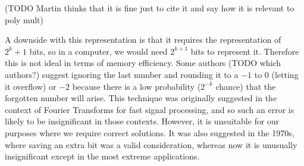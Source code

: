 \medskip

(TODO Martin thinks that it is fine just to cite it and say how it is relevant to poly mult)

\medskip

A downside with this representation is that it requires the representation of $2^k + 1$ bits, so in a computer, we would need $2^{k+1}$ bits to represent it. Therefore this is not ideal in terms of memory efficiency. Some authors (TODO which authors?) suggest ignoring the last number and rounding it to a $-1$ to $0$ (letting it overflow) or $-2$ because there is a low probability ($2^{-k}$ chance) that the forgotten number will arise. This technique was originally suggested in the context of Fourier Transforms for fast signal processing, and so such an error is likely to be insignificant in those contexts. However, it is unsuitable for our purposes where we require correct solutions. It was also suggested in the 1970s, where saving an extra bit was a valid consideration, whereas now it is unusually insignificant except in the most extreme applications.








